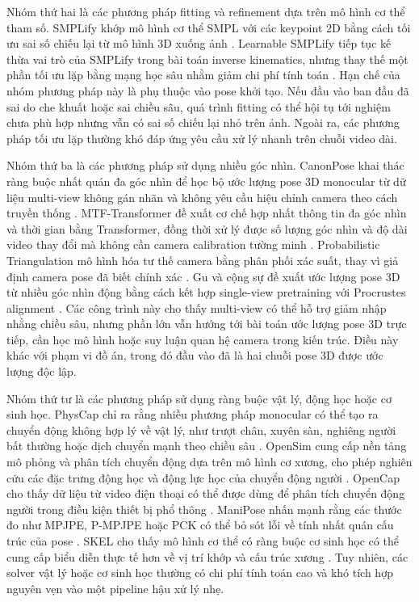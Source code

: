 \documentclass[../DoAn.tex]{subfiles}
\begin{document}
Nhóm thứ hai là các phương pháp fitting và refinement dựa trên mô hình cơ thể tham số. SMPLify khớp mô hình cơ thể SMPL với các keypoint 2D bằng cách tối ưu sai số chiếu lại từ mô hình 3D xuống ảnh \cite{smplify2016}. Learnable SMPLify tiếp tục kế thừa vai trò của SMPLify trong bài toán inverse kinematics, nhưng thay thế một phần tối ưu lặp bằng mạng học sâu nhằm giảm chi phí tính toán \cite{yang2025learnable}. Hạn chế của nhóm phương pháp này là phụ thuộc vào pose khởi tạo. Nếu đầu vào ban đầu đã sai do che khuất hoặc sai chiều sâu, quá trình fitting có thể hội tụ tới nghiệm chưa phù hợp nhưng vẫn có sai số chiếu lại nhỏ trên ảnh. Ngoài ra, các phương pháp tối ưu lặp thường khó đáp ứng yêu cầu xử lý nhanh trên chuỗi video dài.

Nhóm thứ ba là các phương pháp sử dụng nhiều góc nhìn. CanonPose khai thác ràng buộc nhất quán đa góc nhìn để học bộ ước lượng pose 3D monocular từ dữ liệu multi-view không gán nhãn và không yêu cầu hiệu chỉnh camera theo cách truyền thống \cite{canonpose2021}. MTF-Transformer đề xuất cơ chế hợp nhất thông tin đa góc nhìn và thời gian bằng Transformer, đồng thời xử lý được số lượng góc nhìn và độ dài video thay đổi mà không cần camera calibration tường minh \cite{mtftransformer2023}. Probabilistic Triangulation mô hình hóa tư thế camera bằng phân phối xác suất, thay vì giả định camera pose đã biết chính xác \cite{probtriangulation2023}. Gu và cộng sự đề xuất ước lượng pose 3D từ nhiều góc nhìn động bằng cách kết hợp single-view pretraining với Procrustes alignment \cite{gu2024multiview}. Các công trình này cho thấy multi-view có thể hỗ trợ giảm nhập nhằng chiều sâu, nhưng phần lớn vẫn hướng tới bài toán ước lượng pose 3D trực tiếp, cần học mô hình hoặc suy luận quan hệ camera trong kiến trúc. Điều này khác với phạm vi đồ án, trong đó đầu vào đã là hai chuỗi pose 3D được ước lượng độc lập.

Nhóm thứ tư là các phương pháp sử dụng ràng buộc vật lý, động học hoặc cơ sinh học. PhysCap chỉ ra rằng nhiều phương pháp monocular có thể tạo ra chuyển động không hợp lý về vật lý, như trượt chân, xuyên sàn, nghiêng người bất thường hoặc dịch chuyển mạnh theo chiều sâu \cite{physcap2020}. OpenSim cung cấp nền tảng mô phỏng và phân tích chuyển động dựa trên mô hình cơ xương, cho phép nghiên cứu các đặc trưng động học và động lực học của chuyển động người \cite{delp2007opensim}. OpenCap cho thấy dữ liệu từ video điện thoại có thể được dùng để phân tích chuyển động người trong điều kiện thiết bị phổ thông \cite{uhlrich2023opencap}. ManiPose nhấn mạnh rằng các thước đo như MPJPE, P-MPJPE hoặc PCK có thể bỏ sót lỗi về tính nhất quán cấu trúc của pose \cite{manipose2024}. SKEL cho thấy mô hình cơ thể có ràng buộc cơ sinh học có thể cung cấp biểu diễn thực tế hơn về vị trí khớp và cấu trúc xương \cite{keller2023skin}. Tuy nhiên, các solver vật lý hoặc cơ sinh học thường có chi phí tính toán cao và khó tích hợp nguyên vẹn vào một pipeline hậu xử lý nhẹ.
\end{document}
